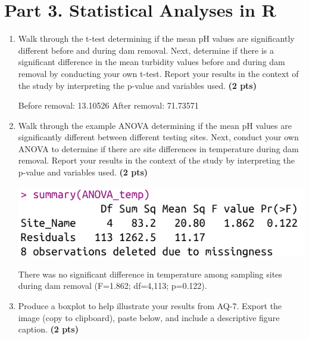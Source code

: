 \documentclass[12pt,letterpaper]{article}
\begin{document}
\section*{Part 3. Statistical Analyses in R}
\begin{enumerate}[font=\bfseries, wide, resume]
    \item Walk through the t-test determining if the mean pH values are significantly different before and during dam removal. Next, determine if there is a significant difference in the mean turbidity values before and during dam removal by conducting your own t-test. Report your results in the context of the study by interpreting the p-value and variables used. \textbf{(2 pts)}\par 

    Before removal: 13.10526              
    After removal: 71.73571 

    \item Walk through the example ANOVA determining if the mean pH values are significantly different between different testing sites. Next, conduct your own ANOVA to determine if there are site differences in temperature during dam removal. Report your results in the context of the study by interpreting the p-value and variables used. \textbf{(2 pts)}
    
    \begin{center}
        \includegraphics[scale=0.5]{images/a2-qst7.png}
    \end{center}

    There was no significant difference in temperature among sampling sites during dam removal (F=1.862; df=4,113; p=0.122).

    \item Produce a boxplot to help illustrate your results from AQ-7. Export the image (copy to clipboard), paste below, and include a descriptive figure caption. \textbf{(2 pts)}


\end{enumerate}
\end{document}
